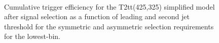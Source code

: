 \begin{figure}[h!]
  \begin{center}
     ~~
     \\
    \caption{
Cumulative trigger efficiency for the T2tt(425,325) simplified model after signal selection as a function of leading and second jet threshold for the symmetric and asymmetric selection requirements for the lowest-\scalht bin.}
    \label{fig:T1ttt_Trigger_Efficiency_DijetAve}
  \end{center} 
\end{figure}



% 
